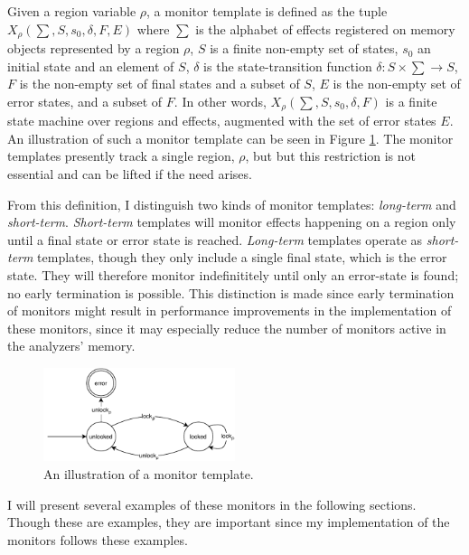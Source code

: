 \newpar Given a region variable $\rho$, a monitor template is defined as the tuple $X_\rho (\sum, S, s_0, \delta, F, E)$ where $\sum$ is the alphabet of effects registered on memory objects represented by a region $\rho$, $S$ is a finite non-empty set of states, $s_0$ an initial state and an element of $S$, $\delta$ is the state-transition function $\delta: S \times \sum \rightarrow S$, $F$ is the non-empty set of final states and a subset of $S$, $E$ is the non-empty set of error states, and a subset of $F$. In other words, $X_\rho (\sum, S, s_0, \delta, F)$ is a finite state machine over regions and effects, augmented with the set of error states $E$. An illustration of such a monitor template can be seen in Figure \ref{double-unlock-automata-intro}. The monitor templates presently track a single region, $\rho$, but but this restriction is not essential and can be lifted if the need arises. 

\newpar From this definition, I distinguish two kinds of monitor templates: \textit{long-term} and \textit{short-term}. \textit{Short-term} templates will monitor effects happening on a region only until a final state or error state is reached. \textit{Long-term} templates operate as \textit{short-term} templates, though they only include a single final state, which is the error state. They will therefore monitor indefinititely until only an error-state is found; no early termination is possible. This distinction is made since early termination of monitors might result in performance improvements in the implementation of these monitors, since it may especially reduce the number of monitors active in the analyzers' memory. 

\begin{figure}[H]
    \centering
    \includegraphics[width=0.5\textwidth]{algorithm/figures/double-unlock}
    \caption{An illustration of a monitor template.}
    \label{double-unlock-automata-intro}
\end{figure}

\newpar I will present several examples of these monitors in the following sections. Though these are examples, they are important since my implementation of the monitors follows these examples. 

